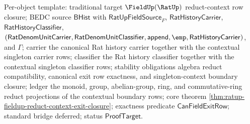 Per-object template: traditional target $\FieldUp(\RatUp)$ reduct-context row
closure; BEDC source $\mathsf{BHist}$ with $\mathsf{RatUpFieldSource}_F$,
$\mathsf{RatHistoryCarrier}$, $\mathsf{RatHistoryClassifier}$,
$(\mathsf{RatDenomUnitCarrier},\mathsf{RatDenomUnitClassifier},
\mathsf{append},\emp,\mathsf{RatHistoryCarrier})$, and $\Gamma$; carrier the
canonical Rat history carrier together with the contextual singleton carrier
rows; classifier the Rat history classifier together with the contextual
singleton classifier rows; stability obligations algebra reduct compatibility,
canonical exit row exactness, and singleton-context boundary closure; ledger the
monoid, group, abelian-group, ring, and commutative-ring reduct projections of
the contextual boundary rows; core theorem
\autoref{thm:ratup-fieldup-reduct-context-exit-closure}; exactness predicate
$\mathsf{CanFieldExitRow}$; standard bridge deferred; status
$\mathsf{ProofTarget}$.

